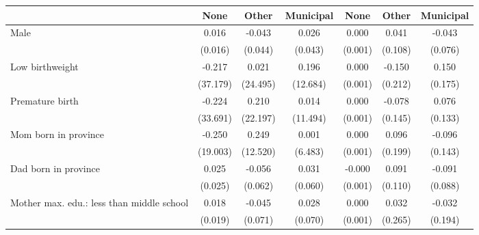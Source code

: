 {
\def\sym#1{\ifmmode^{#1}\else\(^{#1}\)\fi}
\begin{tabular}{l*{6}{c}}
\toprule
                    &\multicolumn{1}{c}{None}&\multicolumn{1}{c}{Other}&\multicolumn{1}{c}{Municipal}&\multicolumn{1}{c}{None}&\multicolumn{1}{c}{Other}&\multicolumn{1}{c}{Municipal}\\
\midrule
Male                &       0.016         &      -0.043         &       0.026         &       0.000         &       0.041         &      -0.043         \\
                    &     (0.016)         &     (0.044)         &     (0.043)         &     (0.001)         &     (0.108)         &     (0.076)         \\
\addlinespace
Low birthweight     &      -0.217         &       0.021         &       0.196         &       0.000         &      -0.150         &       0.150         \\
                    &    (37.179)         &    (24.495)         &    (12.684)         &     (0.001)         &     (0.212)         &     (0.175)         \\
\addlinespace
Premature birth     &      -0.224         &       0.210         &       0.014         &       0.000         &      -0.078         &       0.076         \\
                    &    (33.691)         &    (22.197)         &    (11.494)         &     (0.001)         &     (0.145)         &     (0.133)         \\
\addlinespace
Mom born in province&      -0.250         &       0.249         &       0.001         &       0.000         &       0.096         &      -0.096         \\
                    &    (19.003)         &    (12.520)         &     (6.483)         &     (0.001)         &     (0.199)         &     (0.143)         \\
\addlinespace
Dad born in province&       0.025         &      -0.056         &       0.031         &      -0.000         &       0.091         &      -0.091         \\
                    &     (0.025)         &     (0.062)         &     (0.060)         &     (0.001)         &     (0.110)         &     (0.088)         \\
\addlinespace
Mother max. edu.: less than middle school&       0.018         &      -0.045         &       0.028         &       0.000         &       0.032         &      -0.032         \\
                    &     (0.019)         &     (0.071)         &     (0.070)         &     (0.001)         &     (0.265)         &     (0.194)         \\

\end{tabular}}
